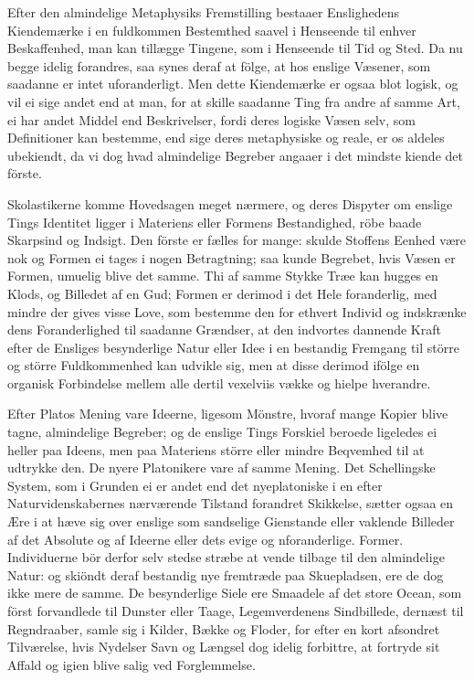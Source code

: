 \documentclass[12pt,a4paper]{article}
\newcommand{\opage}[1]{\marginnote{\footnotesize\textit{[#1]}}}
\begin{document}
Efter den almindelige Metaphysiks Fremstilling bestaaer Enslighedens
Kiendemærke i en fuldkommen Bestemthed saavel i Henseende til enhver
Beskaffenhed, man kan tillægge Tingene, som i Henseende til Tid og Sted.
Da nu begge idelig forandres, saa synes deraf at fölge, at hos enslige
Væsener, som saadanne er intet uforanderligt. Men dette Kiendemærke er
ogsaa blot logisk, og vil ei sige andet end at man, for at skille saadanne
Ting fra andre af samme Art, ei har andet Middel end Beskrivelser, fordi
deres logiske Væsen selv, som Definitioner kan bestemme, end sige deres
metaphysiske og reale, er os aldeles ubekiendt, da vi dog hvad almindelige
Begreber angaaer i det mindste kiende det förste.

Skolastikerne komme Hovedsagen meget nærmere, og deres Dispyter om enslige
Tings Identitet ligger i Materiens eller Formens Bestandighed, röbe baade
Skarpsind og Indsigt. Den förste er fælles for mange: skulde Stoffens
Eenhed være nok og Formen ei tages i nogen Betragtning; saa kunde
Begrebet, hvis Væsen er Formen, umuelig blive det samme. Thi af samme
Stykke Træe kan hugges en Klods, og Billedet af en Gud; Formen er derimod
i det Hele foranderlig, med mindre der gives visse Love, som bestemme den
for ethvert Individ og indskrænke dens Foranderlighed til saadanne
Grændser, at den indvortes dannende Kraft efter de Ensliges besynderlige
Natur eller
\opage{231} Idee i en bestandig Fremgang til större og större Fuldkommenhed kan
udvikle sig, men at disse derimod ifölge en organisk Forbindelse mellem
alle dertil vexelviis vække og hielpe hverandre.

Efter Platos Mening vare Ideerne, ligesom Mönstre, hvoraf mange Kopier
blive tagne, almindelige Begreber; og de enslige Tings Forskiel beroede
ligeledes ei heller paa Ideens, men paa Materiens större eller mindre
Beqvemhed til at udtrykke den. De nyere Platonikere vare af samme Mening.
Det Schellingske System, som i Grunden ei er andet end det nyeplatoniske i
en efter Naturvidenskabernes nærværende Tilstand forandret Skikkelse,
sætter ogsaa en Ære i at hæve sig over enslige som sandselige Gienstande
eller vaklende Billeder af det Absolute og af Ideerne eller dets evige og
nforanderlige. Former. Individuerne bör derfor selv stedse stræbe at vende
tilbage til den almindelige Natur: og skiöndt deraf bestandig nye
fremtræde paa Skuepladsen, ere de dog ikke mere de samme. De besynderlige
Siele ere Smaadele af det store Ocean, som först forvandlede til Dunster
eller Taage, Legemverdenens Sindbillede, dernæst til Regndraaber, samle
sig i Kilder, Bække og Floder, for efter en kort afsondret Tilværelse,
hvis Nydelser Savn og Længsel dog idelig forbittre, at fortryde sit Affald
og igien blive salig ved Forglemmelse.
\end{document}
